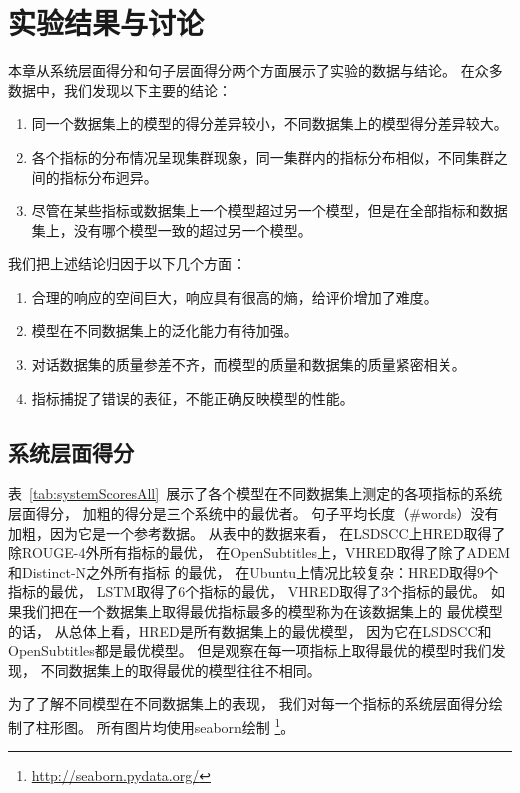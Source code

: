 
\chapter{实验结果与讨论}\label{ch:experiment}
本章从系统层面得分和句子层面得分两个方面展示了实验的数据与结论。
在众多数据中，我们发现以下主要的结论：
\begin{enumerate}
    \item 同一个数据集上的模型的得分差异较小，不同数据集上的模型得分差异较大。
    \item 各个指标的分布情况呈现集群现象，同一集群内的指标分布相似，不同集群之间的指标分布迥异。
    \item 尽管在某些指标或数据集上一个模型超过另一个模型，但是在全部指标和数据集上，没有哪个模型一致的超过另一个模型。
\end{enumerate}
我们把上述结论归因于以下几个方面：
\begin{enumerate}
    \item 合理的响应的空间巨大，响应具有很高的熵，给评价增加了难度。
    \item 模型在不同数据集上的泛化能力有待加强。
    \item 对话数据集的质量参差不齐，而模型的质量和数据集的质量紧密相关。
    \item 指标捕捉了错误的表征，不能正确反映模型的性能。
\end{enumerate}

\section{系统层面得分}\label{sec:system_scores}
表~\ref{tab:systemScoresAll}~展示了各个模型在不同数据集上测定的各项指标的系统层面得分，
加粗的得分是三个系统中的最优者。
句子平均长度（\#words）没有加粗，因为它是一个参考数据。
从表中的数据来看，
在LSDSCC上HRED取得了除ROUGE-4外所有指标的最优，
在OpenSubtitles上，VHRED取得了除了ADEM和Distinct-N之外所有指标
的最优，
在Ubuntu上情况比较复杂：HRED取得9个指标的最优，
LSTM取得了6个指标的最优，
VHRED取得了3个指标的最优。
如果我们把在一个数据集上取得最优指标最多的模型称为在该数据集上的
最优模型的话，
从总体上看，HRED是所有数据集上的最优模型，
因为它在LSDSCC和OpenSubtitles都是最优模型。
但是观察在每一项指标上取得最优的模型时我们发现，
不同数据集上的取得最优的模型往往不相同。

为了了解不同模型在不同数据集上的表现，
我们对每一个指标的系统层面得分绘制了柱形图。
所有图片均使用seaborn绘制
\footnote{\url{http://seaborn.pydata.org/}}。

